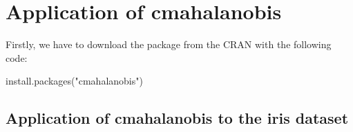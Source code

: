 \documentclass[article]{jss}
\begin{document}
\section{Application of cmahalanobis}

Firstly, we have to download the  package from the CRAN with the following code:
\begin{CodeChunk}
\begin{CodeInput}
install.packages("cmahalanobis")
\end{CodeInput}
\end{CodeChunk}

\subsection{Application of cmahalanobis to the iris dataset}\label{Application of cmahalanobis to the iris dataset}
\end{document}
